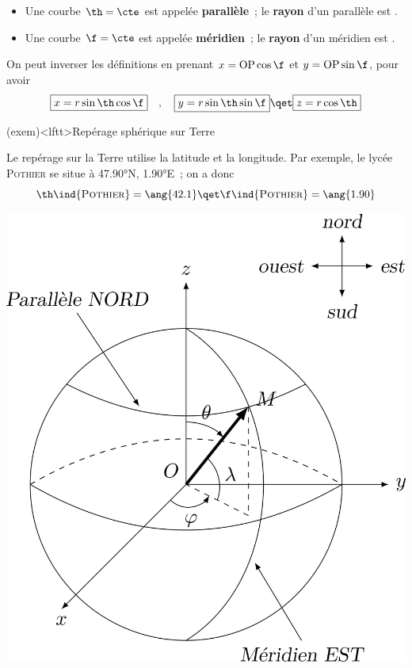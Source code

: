 \documentclass[../../main/main.tex]{subfiles}
\begin{document}
\begin{itemize}
	\item Une courbe $\th = \cte$ est appelée \textbf{parallèle}~; le
	      \textbf{rayon} d'un parallèle est .
	\item Une courbe $\f = \cte$ est appelée \textbf{méridien}~; le
	      \textbf{rayon} d'un méridien est .
\end{itemize}

On peut inverser les définitions en prenant $x = {\rm OP}\cos\f$ et $y = {\rm
	OP}\sin\f$, pour avoir
\[
	\boxed{x = r\sin\th\cos\f}
	\quad,\quad
	\boxed{y = r\sin\th\sin\f}
	\qet
	\boxed{z = r\cos\th}
\]

\begin{tcb*}(exem)<lftt>{Repérage sphérique sur Terre}
	\begin{minipage}{0.70\linewidth}
		Le repérage sur la Terre utilise la latitude et la longitude. Par
		exemple, le lycée \textsc{Pothier} se situe à \ang{47.90}N,
		\ang{1.90;;}E~; on a donc
		\[
			\th\ind{\textsc{Pothier}} = \ang{42.1}
			\qet
			\f\ind{\textsc{Pothier}} = \ang{1.90}
		\]
	\end{minipage}
	\hfill
	\begin{minipage}{0.25\linewidth}
		\begin{center}
			\includegraphics[width=\linewidth]{sph_terre}
		\end{center}
	\end{minipage}
\end{tcb*}
\end{document}
